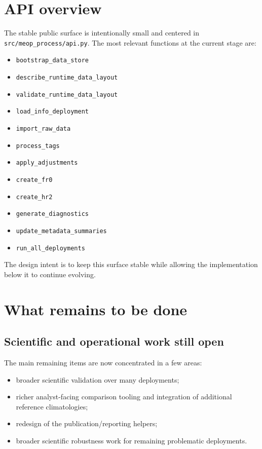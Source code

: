 \documentclass[11pt,a4paper]{article}
\newcommand{\pkg}[1]{\texttt{#1}}
\begin{document}
\section{API overview}

The stable public surface is intentionally small and centered in \pkg{src/meop\_process/api.py}. The most relevant functions at the current stage are:

\begin{itemize}[leftmargin=1.5em]
  \item \pkg{bootstrap\_data\_store}
  \item \pkg{describe\_runtime\_data\_layout}
  \item \pkg{validate\_runtime\_data\_layout}
  \item \pkg{load\_info\_deployment}
  \item \pkg{import\_raw\_data}
  \item \pkg{process\_tags}
  \item \pkg{apply\_adjustments}
  \item \pkg{create\_fr0}
  \item \pkg{create\_hr2}
  \item \pkg{generate\_diagnostics}
  \item \pkg{update\_metadata\_summaries}
  \item \pkg{run\_all\_deployments}
\end{itemize}

The design intent is to keep this surface stable while allowing the implementation below it to continue evolving.

\section{What remains to be done}

\subsection{Scientific and operational work still open}

The main remaining items are now concentrated in a few areas:

\begin{itemize}[leftmargin=1.5em]
  \item broader scientific validation over many deployments;
  \item richer analyst-facing comparison tooling and integration of additional reference climatologies;
  \item redesign of the publication/reporting helpers;
  \item broader scientific robustness work for remaining problematic deployments.
\end{itemize}
\end{document}
